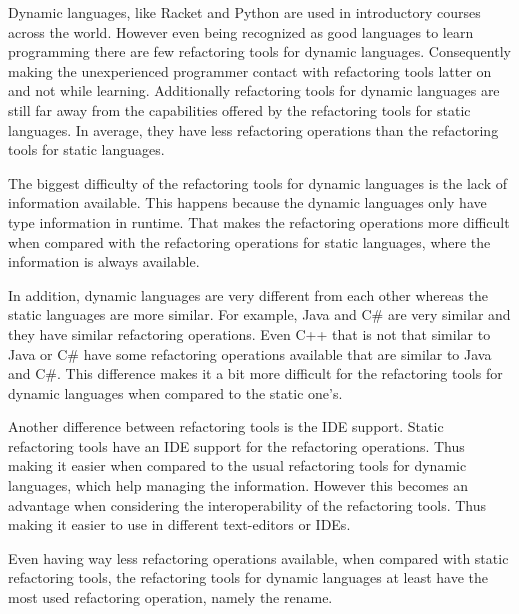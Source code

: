 


Dynamic languages, like Racket and Python are used in introductory courses across the world.
However even being recognized as good languages to learn programming there are few refactoring tools for dynamic languages. 
Consequently making the unexperienced programmer contact with refactoring tools latter on and not while learning.
Additionally refactoring tools for dynamic languages are still far away from the capabilities offered by the refactoring tools for static languages. 
In average, they have less refactoring operations than the refactoring tools for static languages.

The biggest difficulty of the refactoring tools for dynamic languages is the lack of information available. 
This happens because the dynamic languages only have type information in runtime. 
That makes the refactoring operations more difficult when compared with the refactoring operations for static languages, where the information is always available.

In addition, dynamic languages are very different from each other whereas the static languages are more similar.
For example, Java and C\# are very similar and they have similar refactoring operations.
Even C++ that is not that similar to Java or C\# have some refactoring operations available that are similar to Java and C\#. 
This difference makes it a bit more difficult for the refactoring tools for dynamic languages when compared to the static one's. %

Another difference between refactoring tools is the IDE support. 
Static refactoring tools have an IDE support for the refactoring operations. 
Thus making it easier when compared to the usual refactoring tools for dynamic languages, which help managing the information. 
However this becomes an advantage when considering the interoperability of the refactoring tools. 
Thus making it easier to use in different text-editors or IDEs.

Even having way less refactoring operations available, when compared with static refactoring tools, the refactoring tools for dynamic languages at least have the most used refactoring operation, namely the rename.


